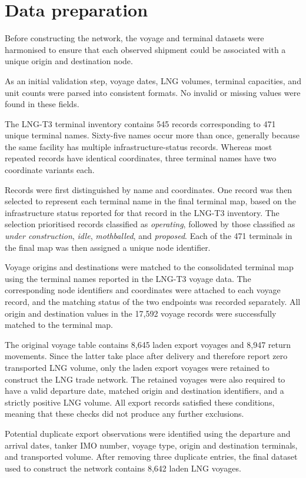 \documentclass[pdftex,12pt,openright,a4paper,oneside]{book}
\begin{document}
\section{Data preparation}
\label{sec:data_preparation}
Before constructing the network, the voyage and terminal datasets were
harmonised to ensure that each observed shipment could be associated
with a unique origin and destination node.

As an initial validation step, voyage dates, LNG volumes, terminal
capacities, and unit counts were parsed into consistent formats. No
invalid or missing values were found in these fields.

The LNG-T3 terminal inventory contains 545 records corresponding to
471 unique terminal names. Sixty-five names occur more than once,
generally because the same facility has multiple infrastructure-status
records. Whereas most repeated records have identical coordinates, three
terminal names have two coordinate variants each.

Records were first distinguished by name and coordinates. 
One record was then selected to represent each terminal name in the final terminal map, based on the infrastructure status reported for that record in the LNG-T3 inventory. 
The selection prioritised records classified as \emph{operating}, followed by those classified as \emph{under construction}, \emph{idle}, \emph{mothballed}, and \emph{proposed}.
Each of the 471 terminals in the final map was then assigned a
unique node identifier.

Voyage origins and destinations were matched to the consolidated terminal map using the terminal names reported in the LNG-T3 voyage data. 
The corresponding node identifiers and coordinates were attached to each voyage record, and the matching status of the two endpoints was recorded separately. 
All origin and destination values in the 17,592 voyage records were successfully matched to the terminal map.

The original voyage table contains 8,645 laden export voyages and 8,947 return movements. Since the latter take place after delivery and therefore report zero transported LNG volume, only the laden export voyages were retained to construct the LNG trade network. 
The retained voyages were also required to have a valid departure date, matched origin and destination identifiers, and a strictly positive LNG volume.
All export records satisfied these conditions, meaning that these checks did not produce any further exclusions.

Potential duplicate export observations were identified using the departure and arrival dates, tanker IMO number, voyage type, origin and destination terminals, and transported volume. 
After removing three duplicate entries, the final dataset used to construct the network contains 8,642 laden LNG voyages.
\end{document}
